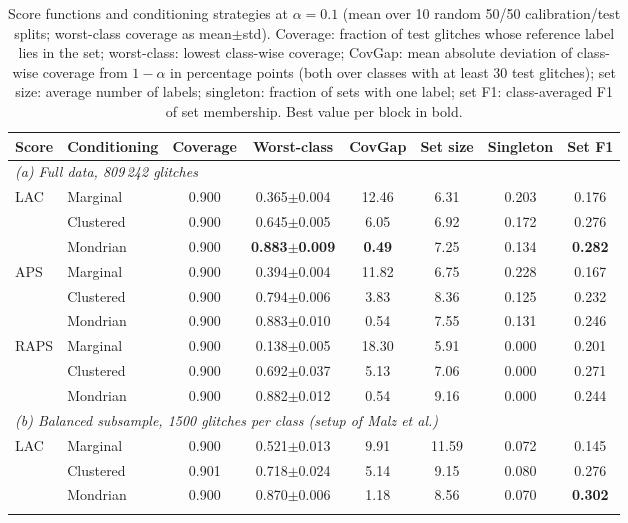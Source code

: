 \begin{table}[!htbp]
\caption{Score functions and conditioning strategies at $\alpha=0.1$ (mean over 10 random 50/50 calibration/test splits;
worst-class coverage as mean$\pm$std). Coverage: fraction of test glitches whose reference label lies in the set; worst-class:
lowest class-wise coverage; CovGap: mean absolute deviation of class-wise coverage from $1-\alpha$ in percentage points (both over
classes with at least 30 test glitches); set size: average number of labels; singleton: fraction of sets with one label; set F1:
class-averaged F1 of set membership. Best value per block in bold.}\label{tab:e1}
\centering\footnotesize\setlength{\tabcolsep}{3.5pt}
\begin{tabular}{llcccccc}\toprule
Score & Conditioning & Coverage & Worst-class & CovGap & Set size & Singleton & Set F1\\\midrule
\multicolumn{8}{l}{\emph{(a) Full data, 809\,242 glitches}}\\
LAC & Marginal & 0.900 & 0.365$\pm$0.004 & 12.46 & 6.31 & 0.203 & 0.176\\
 & Clustered & 0.900 & 0.645$\pm$0.005 & 6.05 & 6.92 & 0.172 & 0.276\\
 & Mondrian & 0.900 & \textbf{0.883$\pm$0.009} & \textbf{0.49} & 7.25 & 0.134 & \textbf{0.282}\\
\addlinespace[2pt]
APS & Marginal & 0.900 & 0.394$\pm$0.004 & 11.82 & 6.75 & 0.228 & 0.167\\
 & Clustered & 0.900 & 0.794$\pm$0.006 & 3.83 & 8.36 & 0.125 & 0.232\\
 & Mondrian & 0.900 & 0.883$\pm$0.010 & 0.54 & 7.55 & 0.131 & 0.246\\
\addlinespace[2pt]
RAPS & Marginal & 0.900 & 0.138$\pm$0.005 & 18.30 & 5.91 & 0.000 & 0.201\\
 & Clustered & 0.900 & 0.692$\pm$0.037 & 5.13 & 7.06 & 0.000 & 0.271\\
 & Mondrian & 0.900 & 0.882$\pm$0.012 & 0.54 & 9.16 & 0.000 & 0.244\\
\midrule
\multicolumn{8}{l}{\emph{(b) Balanced subsample, 1500 glitches per class (setup of Malz et al.)}}\\
LAC & Marginal & 0.900 & 0.521$\pm$0.013 & 9.91 & 11.59 & 0.072 & 0.145\\
 & Clustered & 0.901 & 0.718$\pm$0.024 & 5.14 & 9.15 & 0.080 & 0.276\\
 & Mondrian & 0.900 & 0.870$\pm$0.006 & 1.18 & 8.56 & 0.070 & \textbf{0.302}\\
\addlinespace[2pt]

\end{tabular}
\end{table}
